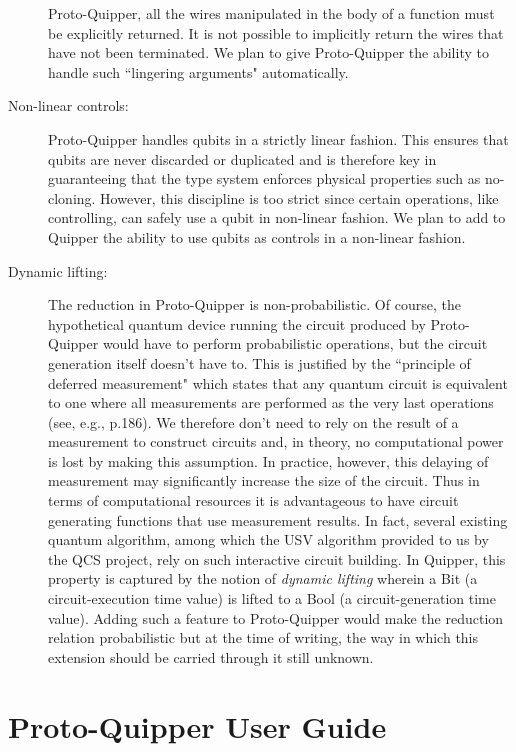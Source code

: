 \documentclass{article}
\begin{document}
\begin{description}
    Proto-Quipper, all the wires manipulated in the body of a function 
    must be explicitly returned. It is not possible to implicitly 
    return the wires that have not been terminated. We plan to 
    give Proto-Quipper the ability to handle such ``lingering 
    arguments" automatically.
  \item[Non-linear controls:] Proto-Quipper handles qubits 
    in a strictly linear fashion. This ensures that qubits are 
    never discarded or duplicated and is therefore key in 
    guaranteeing that the type system enforces physical properties 
    such as no-cloning. However, this discipline is too strict since 
    certain operations, like controlling, can safely use a qubit in 
    non-linear fashion. We plan to add to Quipper the ability to 
   use qubits as controls in a non-linear fashion.
  \item[Dynamic lifting:] The reduction in Proto-Quipper 
    is non-probabilistic. Of course, the hypothetical quantum 
    device running the circuit produced by Proto-Quipper would 
    have to perform probabilistic operations, but the circuit 
    generation itself doesn't have to. This is justified by the 
    ``principle of deferred measurement" which states that any 
    quantum circuit is equivalent to one where all measurements 
    are performed as the very last operations (see, e.g., 
    \cite{NC02} p.186). We therefore don't need to rely on the 
    result of a measurement to construct circuits and, in theory, 
    no computational power is lost by making this assumption. In 
    practice, however, this delaying of measurement may 
    significantly increase the size of the circuit. Thus in terms 
    of computational resources it is advantageous to have circuit 
    generating functions that use measurement results. In fact, 
    several existing quantum algorithm, among which the USV 
    algorithm provided to us by the QCS project, rely on such 
    interactive circuit building. In Quipper, this property is 
    captured by the notion of \emph{dynamic lifting} wherein a 
    Bit (a circuit-execution time value) is lifted to a Bool (a 
    circuit-generation time value). Adding such a feature to 
    Proto-Quipper would make the reduction relation probabilistic 
    but at the time of writing, the way in which this extension 
    should be carried through it still unknown. 
\end{description}

\section{Proto-Quipper User Guide}
\label{sec-user-guide}
\end{document}
